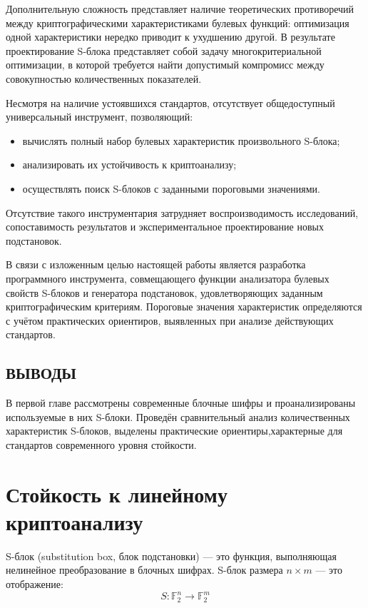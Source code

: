 Дополнительную сложность представляет наличие теоретических
противоречий между криптографическими характеристиками булевых функций: оптимизация одной характеристики нередко приводит к ухудшению другой. В результате проектирование S-блока
представляет собой задачу многокритериальной оптимизации, в которой
требуется найти допустимый компромисс между совокупностью количественных
показателей.

Несмотря на наличие устоявшихся стандартов, отсутствует общедоступный
универсальный инструмент, позволяющий:
\begin{itemize}
    \item вычислять полный набор булевых характеристик произвольного S-блока;
    \item анализировать их устойчивость к криптоанализу;
    \item осуществлять поиск S-блоков с заданными пороговыми значениями.
\end{itemize}

Отсутствие такого инструментария затрудняет воспроизводимость
исследований, сопоставимость результатов и экспериментальное
проектирование новых подстановок.

В связи с изложенным целью настоящей работы является разработка
программного инструмента, совмещающего функции анализатора булевых
свойств S-блоков и генератора подстановок, удовлетворяющих заданным
криптографическим критериям. Пороговые значения характеристик
определяются с учётом практических ориентиров, выявленных при анализе
действующих стандартов.
\subsection*{ВЫВОДЫ}
В первой главе рассмотрены современные блочные шифры и проанализированы
используемые в них S-блоки. Проведён сравнительный анализ количественных характеристик S-блоков,
выделены практические ориентиры,характерные для стандартов современного уровня стойкости.


\newpage
\section{Стойкость к линейному криптоанализу}
\begin{definition}
S-блок (substitution box, блок подстановки) — это функция, выполняющая нелинейное преобразование в блочных шифрах.
S-блок размера $n\times m$ — это отображение:
\[S : \mathbb{F}_2^n \to \mathbb{F}_2^m\]
\end{definition}
